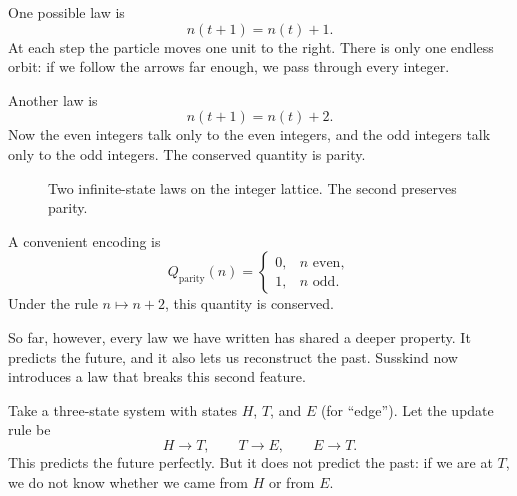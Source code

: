 One possible law is
\begin{equation}
n(t+1)=n(t)+1.
\end{equation}
At each step the particle moves one unit to the right. There is only one endless orbit: if we follow the arrows far enough, we pass through every integer.

Another law is
\begin{equation}
n(t+1)=n(t)+2.
\end{equation}
Now the even integers talk only to the even integers, and the odd integers talk only to the odd integers. The conserved quantity is parity.

\begin{figure}
\centering
{}

\vspace{0.8cm}

\caption{Two infinite-state laws on the integer lattice. The second preserves parity.}
\end{figure}

A convenient encoding is
\[
Q_{\mathrm{parity}}(n)=
\begin{cases}
0,& n \text{ even},\\[4pt]
1,& n \text{ odd}.
\end{cases}
\]
Under the rule \(n\mapsto n+2\), this quantity is conserved.

So far, however, every law we have written has shared a deeper property. It predicts the future, and it also lets us reconstruct the past. Susskind now introduces a law that breaks this second feature.

Take a three-state system with states \(H\), \(T\), and \(E\) (for ``edge''). Let the update rule be
\[
H\to T,\qquad T\to E,\qquad E\to T.
\]
This predicts the future perfectly. But it does not predict the past: if we are at \(T\), we do not know whether we came from \(H\) or from \(E\).

